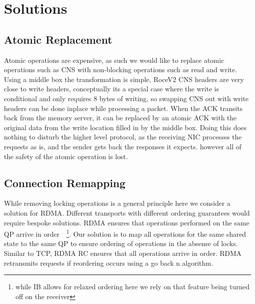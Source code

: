 \section{Solutions}


\subsection{Atomic Replacement} Atomic operations are expensive, as such we
would like to replace atomic operations such as CNS with non-blocking operations
such as read and write. Using a middle box the transformation is simple, RoceV2
CNS headers are very close to write headers, conceptually its a special case
where the write is conditional and only requires 8 bytes of writing, so swapping
CNS out with write headers can be done inplace while processing a packet. When
the ACK transits back from the memory server, it can be replaced by an atomic
ACK with the original data from the write location filled in by the middle box.
Doing this does nothing to disturb the higher level protocol, as the receiving
NIC processes the requests as is, and the sender gets back the responses it
expects. however all of the safety of the atomic operation is lost.  

\subsection{Connection Remapping}

While removing locking operations is a general principle here we consider a
solution for RDMA. Different transports with different ordering guarantees would
require bespoke solutions. RDMA ensures that operations performed on the same QP
arrive in order~\cite{infiniband spec}~\footnote{while IB allows for relaxed
ordering here we rely on that feature being turned off on the receiver}. Our
solution is to map all operations for the same shared state to the same QP to
ensure ordering of operations in the absense of locks. Similar to TCP, RDMA RC
ensures that all operations arrive in order. RDMA retransmits requests if
reordering occurs using a go back n algorithm.

